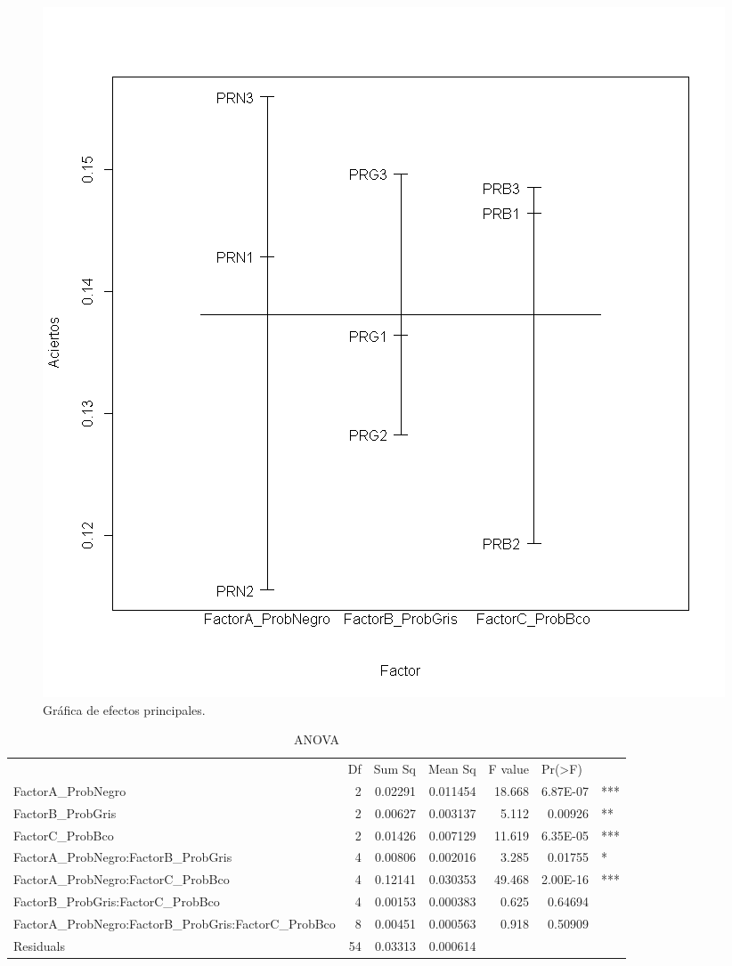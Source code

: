 \documentclass{article}
\begin{document}
	    	\begin{figure}[h!]
	    	\centering
	    	\includegraphics[width=0.7\linewidth]{Rplot02.png}
	    	\caption{Gráfica de efectos principales.}
	    	\label{fig:imagen1}
	    	\end{figure}
    
    \begin{table}[htbp]
    	\centering
    	\caption{ANOVA}
    	\begin{tabular}{lrrrrrr}
    		& \multicolumn{1}{l}{Df} & \multicolumn{1}{l}{Sum Sq} & \multicolumn{1}{l}{Mean   Sq} & \multicolumn{1}{l}{F value} & \multicolumn{1}{l}{Pr(>F)} &  \\
    		FactorA\_ProbNegro & 2     & 0.02291 & 0.011454 & 18.668 & 6.87E-07 & \multicolumn{1}{l}{***} \\
    		FactorB\_ProbGris & 2     & 0.00627 & 0.003137 & 5.112 & 0.00926 & \multicolumn{1}{l}{**} \\
    		FactorC\_ProbBco & 2     & 0.01426 & 0.007129 & 11.619 & 6.35E-05 & \multicolumn{1}{l}{***} \\
    		FactorA\_ProbNegro:FactorB\_ProbGris & 4     & 0.00806 & 0.002016 & 3.285 & 0.01755 & \multicolumn{1}{l}{*} \\
    		FactorA\_ProbNegro:FactorC\_ProbBco & 4     & 0.12141 & 0.030353 & 49.468 & 2.00E-16 & \multicolumn{1}{l}{***} \\
    		FactorB\_ProbGris:FactorC\_ProbBco & 4     & 0.00153 & 0.000383 & 0.625 & 0.64694 &  \\
    		FactorA\_ProbNegro:FactorB\_ProbGris:FactorC\_ProbBco & 8     & 0.00451 & 0.000563 & 0.918 & 0.50909 &  \\
    		Residuals & 54    & 0.03313 & 0.000614 &       &       &  \\
    	\end{tabular}%
    	\label{tab:addlabel}%
    \end{table}%
    	
\end{document}
